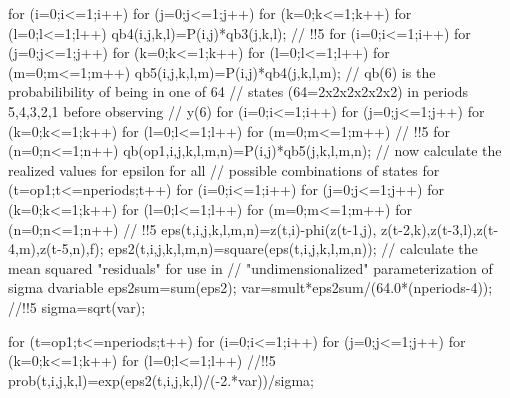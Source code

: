 \documentclass[12pt]{book}
\begin{document}
  for (i=0;i<=1;i++) {
    for (j=0;j<=1;j++) {
      for (k=0;k<=1;k++) {
        for (l=0;l<=1;l++) qb4(i,j,k,l)=P(i,j)*qb3(j,k,l); 
      }
    }  
  }
  // !!5
  for (i=0;i<=1;i++) {
    for (j=0;j<=1;j++) {
      for (k=0;k<=1;k++) {
        for (l=0;l<=1;l++) {
          for (m=0;m<=1;m++) qb5(i,j,k,l,m)=P(i,j)*qb4(j,k,l,m); 
	}  
      }
    }  
  }
  // qb(6) is the probabilibility of being in one of 64
  // states (64=2x2x2x2x2x2) in periods 5,4,3,2,1 before observing
  // y(6)
  for (i=0;i<=1;i++) {
    for (j=0;j<=1;j++) {
      for (k=0;k<=1;k++) {
        for (l=0;l<=1;l++) {
          for (m=0;m<=1;m++) { // !!5
            for (n=0;n<=1;n++) qb(op1,i,j,k,l,m,n)=P(i,j)*qb5(j,k,l,m,n); 
          }	
	}  
      }
    }  
  }
  // now calculate the realized values for epsilon for all 
  // possible combinations of states
  for (t=op1;t<=nperiods;t++) {
    for (i=0;i<=1;i++) {
      for (j=0;j<=1;j++) {
        for (k=0;k<=1;k++) {
          for (l=0;l<=1;l++) {
            for (m=0;m<=1;m++) {
              for (n=0;n<=1;n++) { // !!5
	        eps(t,i,j,k,l,m,n)=z(t,i)-phi(z(t-1,j),
	          z(t-2,k),z(t-3,l),z(t-4,m),z(t-5,n),f);
                eps2(t,i,j,k,l,m,n)=square(eps(t,i,j,k,l,m,n));
              }		
	    }  
	  }
	}
      }	    		
    }  
  }  
  // calculate the mean squared "residuals" for use in 
  // "undimensionalized" parameterization of sigma
  dvariable eps2sum=sum(eps2);
  var=smult*eps2sum/(64.0*(nperiods-4));  //!!5
  sigma=sqrt(var);
  
  for (t=op1;t<=nperiods;t++) {
    for (i=0;i<=1;i++) {
      for (j=0;j<=1;j++) {
        for (k=0;k<=1;k++) {
          for (l=0;l<=1;l++)  //!!5
	    prob(t,i,j,k,l)=exp(eps2(t,i,j,k,l)/(-2.*var))/sigma;
        }	    
      }	    		
    }  
  }  
  
\end{document}
